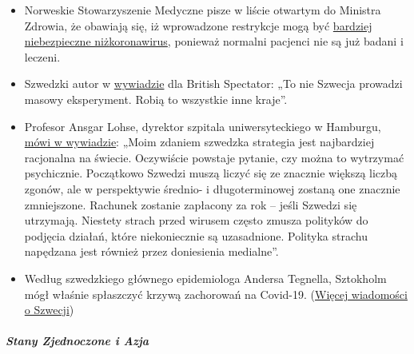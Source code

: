 \begin{itemize}
\tightlist
\item
  Norweskie Stowarzyszenie Medyczne pisze w liście otwartym do Ministra
  Zdrowia, że obawiają się, iż wprowadzone restrykcje mogą być
  \href{https://www.abcnyheter.no/helse-og-livsstil/helse/2020/04/06/195667780/nesten-halvparten-av-sengene-pa-oslo-universitetssykehus-star-tomme}{bardziej
  niebezpieczne
  niż}\href{https://www.abcnyheter.no/helse-og-livsstil/helse/2020/04/06/195667780/nesten-halvparten-av-sengene-pa-oslo-universitetssykehus-star-tomme}{koronawirus},
  ponieważ normalni pacjenci nie są już badani i leczeni.
\item
  Szwedzki autor w
  \href{https://www.spectator.co.uk/article/no-lockdown-please-w-re-swedish}{wywiadzie}
  dla British Spectator: „To nie Szwecja prowadzi masowy eksperyment.
  Robią to wszystkie inne kraje''.
\item
  Profesor Ansgar Lohse, dyrektor szpitala uniwersyteckiego w Hamburgu,
  \href{https://www.abendblatt.de/hamburg/article228880917/uke-professor-shutdown-lohse-deutschland-hamburg-corona-virus-infektion-covid-19-impfstoff-coronavirus-krise-patienten-immunitaet-krankenhaeuser-kontaktverbot-kliniken-infektionsrate.html}{mówi
  w wywiadzie}: „Moim zdaniem szwedzka strategia jest najbardziej
  racjonalna na świecie. Oczywiście powstaje pytanie, czy można to
  wytrzymać psychicznie. Początkowo Szwedzi muszą liczyć się ze znacznie
  większą liczbą zgonów, ale w perspektywie średnio- i długoterminowej
  zostaną one znacznie zmniejszone. Rachunek zostanie zapłacony za rok
  -- jeśli Szwedzi się utrzymają. Niestety strach przed wirusem często
  zmusza polityków do podjęcia działań, które niekoniecznie są
  uzasadnione. Polityka strachu napędzana jest również przez doniesienia
  medialne''.
\item
  Według szwedzkiego głównego epidemiologa Andersa Tegnella, Sztokholm
  mógł właśnie spłaszczyć krzywą zachorowań na Covid-19.
  (\href{https://www.thelocal.se/20200310/timeline-how-the-coronavirus-has-developed-in-sweden}{Więcej
  wiadomości o Szwecji})
\end{itemize}

\hypertarget{stany-zjednoczone-i-azja}{%
\subparagraph{\texorpdfstring{\textbf{Stany Zjednoczone i
Azja}}{Stany Zjednoczone i Azja}}\label{stany-zjednoczone-i-azja}}

